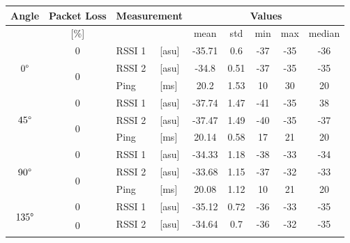 \begin{table}[H]
    \centering
    \begin{tabular}{|c|c|l|l|c|c|c|c|c|}
    \hline
        Angle & Packet Loss & \multicolumn{2}{l|}{Measurement} & \multicolumn{5}{c|}{Values} \\\hline
        [\degree] & [\%] & \multicolumn{2}{l|}{} & mean & std & min & max & median \\\hline\hline
        \multirow{3}{*}{$0\degree$} & \multirow{1}{*}{0} & RSSI 1 & [asu] & -35.71 & 0.6 & -37 & -35 & -36 \\\cline{2-9}\cline{2-9}
        & \multirow{2}{*}{0} & RSSI 2 & [asu] & -34.8 & 0.51 & -37 & -35 & -35 \\\cline{3-9}
        && Ping & [ms] & 20.2 & 1.53 & 10 & 30 & 20 \\\hline\hline
        \multirow{3}{*}{$45\degree$} & \multirow{1}{*}{0} & RSSI 1 & [asu] & -37.74 & 1.47 & -41 & -35 & 38 \\\cline{2-9}\cline{2-9}
        & \multirow{2}{*}{0} & RSSI 2 & [asu] & -37.47 &1.49 & -40 & -35 & -37 \\\cline{3-9}
        && Ping & [ms] & 20.14 & 0.58 & 17 & 21 & 20 \\\hline\hline
        \multirow{3}{*}{$90\degree$} & \multirow{1}{*}{0} & RSSI 1 & [asu] & -34.33 & 1.18 & -38 & -33 & -34 \\\cline{2-9}\cline{2-9}
        & \multirow{2}{*}{0} & RSSI 2 & [asu] & -33.68 & 1.15 & -37 & -32 & -33 \\\cline{3-9}
        && Ping & [ms] & 20.08 & 1.12 & 10 & 21 & 20 \\\hline\hline
        \multirow{3}{*}{$135\degree$} & \multirow{1}{*}{0} & RSSI 1 & [asu] & -35.12 & 0.72 & -36 & -33 & -35 \\\cline{2-9}\cline{2-9}
        & \multirow{2}{*}{0} & RSSI 2 & [asu] & -34.64 & 0.7 & -36 & -32 & -35 \\\cline{3-9}

\end{tabular}
\end{table}

